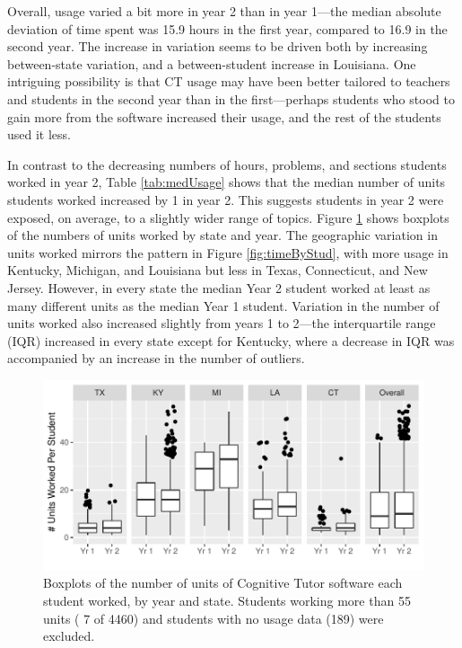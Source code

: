 \documentclass[12pt]{article}\usepackage[]{graphicx}\usepackage[]{color}
\makeatletter
\def\maxwidth{ %
  \ifdim\Gin@nat@width>\linewidth
    \linewidth
  \else
    \Gin@nat@width
  \fi
}
\makeatother
\begin{document}
Overall, usage varied a bit more in year 2 than in year
1---the median absolute deviation of time spent was 15.9 hours in the first year, compared to 16.9 in  the second year.
The increase in variation seems to be driven both by increasing
between-state variation, and a between-student increase in Louisiana.
One intriguing possibility is that CT usage may have been better tailored to
teachers and students in the second year than in the first---perhaps
students who stood to gain more from the software increased their
usage, and the rest of the students used it less.

In contrast to the decreasing numbers of hours, problems, and sections students
worked in year 2, Table \ref{tab:medUsage} shows that the median number of units
students worked increased by
1
in year 2.
This suggests students in year 2 were exposed, on average, to a
slightly wider range of topics.
Figure \ref{fig:unitsByStud} shows boxplots of the numbers of units
worked by state and year.
The geographic variation in units worked mirrors the pattern in Figure
\ref{fig:timeByStud}, with more usage in Kentucky, Michigan, and
Louisiana but less in Texas, Connecticut, and New Jersey.
However, in every state the median Year 2 student worked at least as
many different units as the median Year 1 student.
Variation in the number of units worked also increased slightly
from years 1 to 2---the interquartile range (IQR) increased in every state
except for Kentucky, where a decrease in IQR was accompanied by an
increase in the number of outliers.



\begin{figure}
\centering

\includegraphics[width=\maxwidth]{figure/unitsWorked-1} 

\caption{Boxplots of the number of units of Cognitive Tutor
  software each student worked, by year and state. Students
  working more than 55 units (
  7 of
  4460) and students
  with no usage data (189)
  were excluded.}
\label{fig:unitsByStud}
\end{figure}
\end{document}
